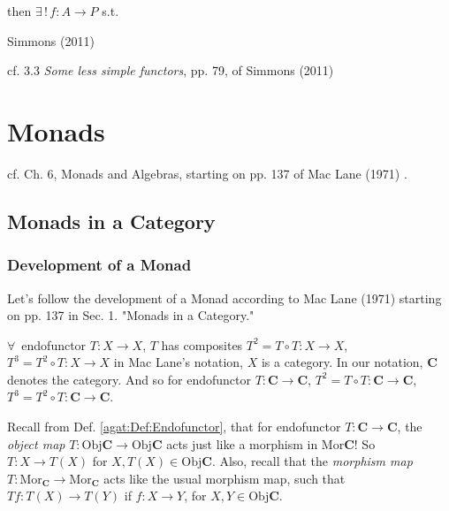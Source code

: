 \begin{definition}
	then $\exists \, ! \, f: A \to P$ s.t. 
	
	
	
\end{definition}

Simmons (2011) \cite{agat:Simm2011}

cf. 3.3 \emph{Some less simple functors}, pp. 79, of Simmons (2011) \cite{agat:Simm2011}

\section{Monads}

cf. Ch. 6, Monads and Algebras, starting on pp. 137 of Mac Lane (1971) \cite{agat:MacL1978}.

\subsection{Monads in a Category}

\subsubsection{Development of a Monad}

Let's follow the development of a Monad according to Mac Lane (1971) \cite{agat:MacL1978} starting on pp. 137 in Sec. 1. "Monads in a Category."

$\forall \, $ endofunctor $T: X \to X$, $T$ has composites $T^2 = T\circ T : X \to X$, $T^3 = T^2 \circ T:X \to X$ in Mac Lane's notation, $X$ is a category. In our notation, $\mathbf{C}$ denotes the category. And so for endofunctor $T: \mathbf{C} \to \mathbf{C}$, $T^2 = T\circ T: \mathbf{C} \to \mathbf{C}$, $T^3 = T^2 \circ T: \mathbf{C} \to \mathbf{C}$. 

Recall from Def. \ref{agat:Def:Endofunctor}, that for endofunctor $T:\mathbf{C} \to \mathbf{C}$, the \emph{object map} $T: \text{Obj}{\mathbf{C}} \to \text{Obj}{\mathbf{C}}$ acts just like a morphism in $\text{Mor}{\mathbf{C}}$! So $T: X \to T(X)$ for $X, T(X) \in \text{Obj}{\mathbf{C}}$. Also, recall that the \emph{morphism map} $T: \text{Mor}_{\mathbf{C}} \to \text{Mor}_{\mathbf{C}}$ acts like the usual morphism map, such that $Tf : T(X) \to T(Y)$ if $f:X\to Y$, for $X,Y \in \text{Obj}{\mathbf{C}}$. \\

